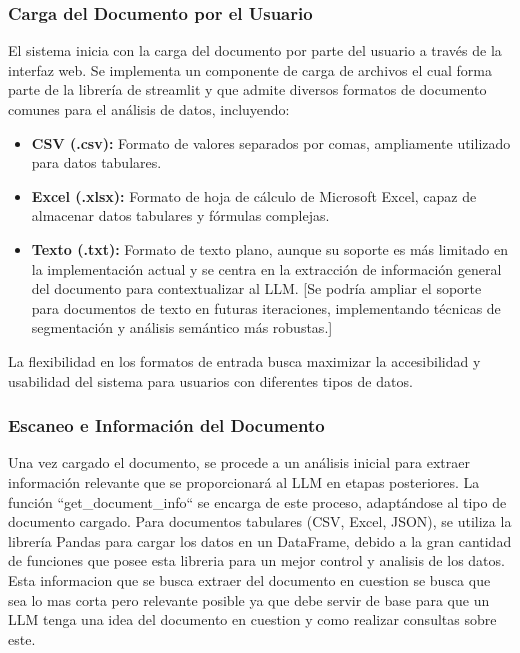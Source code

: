 \subsubsection{Carga del Documento por el Usuario}

El sistema inicia con la carga del documento por parte del usuario a través de la interfaz web. Se implementa un componente de carga de archivos el cual forma parte de la librería de streamlit y que admite diversos formatos de documento comunes para el análisis de datos, incluyendo:
\begin{itemize}
	\item \textbf{CSV (.csv):}  Formato de valores separados por comas, ampliamente utilizado para datos tabulares.
	\item \textbf{Excel (.xlsx):}  Formato de hoja de cálculo de Microsoft Excel, capaz de almacenar datos tabulares y fórmulas complejas.
	\item \textbf{Texto (.txt):}  Formato de texto plano, aunque su soporte es más limitado en la implementación actual y se centra en la extracción de información general del documento para contextualizar al LLM.  [Se podría ampliar el soporte para documentos de texto en futuras iteraciones, implementando técnicas de segmentación y análisis semántico más robustas.]
\end{itemize}

La flexibilidad en los formatos de entrada busca maximizar la accesibilidad y usabilidad del sistema para usuarios con diferentes tipos de datos.

\subsubsection{Escaneo e Información del Documento}

Una vez cargado el documento, se procede a un análisis inicial para extraer información relevante que se proporcionará al LLM en etapas posteriores. La función ``get\_document\_info`` se encarga de este proceso, adaptándose al tipo de documento cargado.  Para documentos tabulares (CSV, Excel, JSON), se utiliza la librería Pandas para cargar los datos en un DataFrame, debido a la gran cantidad de funciones que posee esta libreria para un mejor control y analisis de los datos. Esta informacion que se busca extraer del documento en cuestion se busca que sea lo mas corta pero relevante posible ya que debe servir de base para que un LLM tenga una idea del documento en cuestion y como realizar consultas sobre este.

